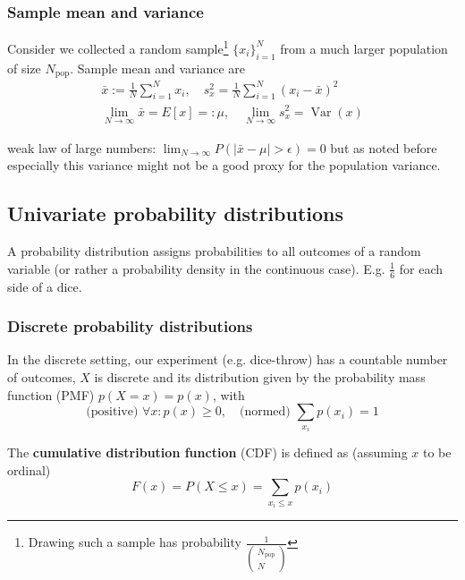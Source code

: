 \subsubsection{Sample mean and variance}
Consider we collected a random sample\footnote{Drawing such a sample has probability $\frac{1}{\left( \begin{array}{c} N_{\text{pop}} \\ N \end{array} \right)}$} $\{x_i\}_{i=1}^N$ from a much larger population
of size $N_{\text{pop}}$. Sample mean and variance are
\begin{equation}
    \begin{gathered}
        \bar{x}:=\frac{1}{N} \sum_{i=1}^N x_i, \quad s_x^2=\frac{1}{N} \sum_{i=1}^N\left(x_i-\bar{x}\right)^2 \\
        \lim _{N \rightarrow \infty} \bar{x}=E[x]=:\mu, \quad \lim _{N \rightarrow \infty} s_x^2=\operatorname{Var}(x)
    \end{gathered}
\end{equation}

weak law of large numbers: $\lim _{N \rightarrow \infty} P(|\bar{x}-\mu|>\epsilon)=0$
but as noted before especially this variance might not be a good proxy for the population variance.

\subsection{Univariate probability distributions}
A probability distribution assigns probabilities to all outcomes of a random variable 
(or rather a probability density in the continuous case). E.g. $\frac{1}{6}$ for each side of a dice.

\subsubsection{Discrete probability distributions}
In the discrete setting, our experiment (e.g. dice-throw) has a countable number of outcomes, $X$ is
discrete and its distribution given by the probability mass function (PMF) $p(X=x) = p(x)$, with
\begin{equation}
    \text{(positive) }\forall x: p(x) \geq 0, \quad \text{(normed) }\sum_{x_i} p(x_i) = 1
\end{equation}

The \textbf{cumulative distribution function} (CDF) is defined as (assuming $x$ to be ordinal)
\begin{equation}
    F(x) = P(X \leq x) = \sum_{x_i \leq x} p(x_i)
\end{equation}

